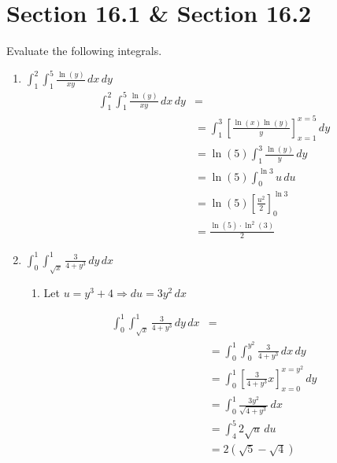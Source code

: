 \documentclass[letter,11pt]{article}
\begin{document}
\section*{Section 16.1 \& Section 16.2}
Evaluate the following integrals.
\begin{enumerate}[label = \alph*.)]
    \item $\int_{1}^{2}\int_{1}^{5} \frac{\ln(y)}{xy} \, dx\,dy$
        \begin{align*}
            \int_{1}^{2}\int_{1}^{5} \frac{\ln(y)}{xy} \, dx\,dy &= \\
            &= \int_{1}^{3}\left[\frac{\ln(x)\ln(y)}{y}\right]_{x=1}^{x=5}\, dy\\
            &= \ln(5)\int_{1}^{3} \frac{\ln(y)}{y} \, dy\\
            &= \ln(5) \int_{0}^{\ln 3} u \, du\\
            & = \ln(5) \left[\frac{u^2}{2}\right]_{0}^{\ln 3}\\
            & = \boxed{\frac{\ln\left(5\right)\cdot \ln^{2}\left(3\right)}{2}}
        \end{align*}
    \item $\int_{0}^{1}\int_{\sqrt{x}}^{1} \frac{3}{4+y^3} \, dy\, dx$
    \begin{enumerate}[label = \roman*.]
        \item Let $u=y^3+4 \Longrightarrow du = 3y^2 \, dx$
    \end{enumerate}
    \begin{align*}
        \int_{0}^{1}\int_{\sqrt{x}}^{1} \frac{3}{4+y^3} \, dy\, dx &=\\
        &= \int_{0}^{1}\int_{0}^{y^2} \frac{3}{4+y^3} \, dx\, dy \\
        &= \int_{0}^{1} \left[\frac{3}{4+y^3} x\right]_{x=0}^{x=y^2}\, dy\\
        & = \int_{0}^{1} \frac{3y^2}{\sqrt{4+y^3}} \, dx\\
        &= \int_{4}^{5} 2\sqrt{u}\, du \\
        &= \boxed{2\left(\sqrt{5}-\sqrt{4}\right)}
    \end{align*}
\end{enumerate}
\end{document}
